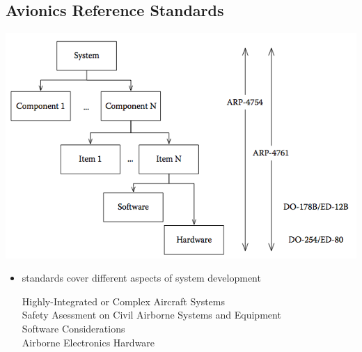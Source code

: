 \documentclass[a4paper, 10pt]{article}
\begin{document}
\subsection*{Avionics Reference Standards}
\begin{center}
    \includegraphics[width=.5\linewidth]{images/arp.png}
\end{center}
\begin{itemize}
    \item standards cover different aspects of system development
    \begin{description}
        \item[Highly-Integrated or Complex Aircraft Systems]
        \item[Safety Asessment on Civil Airborne Systems and Equipment]
        \item[Software Considerations]
        \item[Airborne Electronics Hardware]
    \end{description}
\end{itemize}
\end{document}
